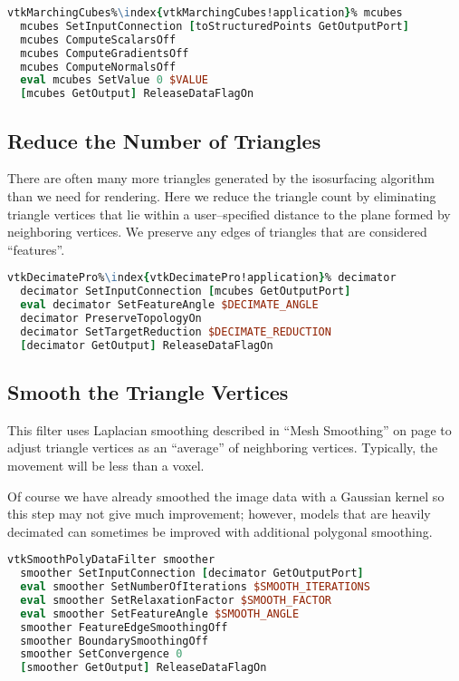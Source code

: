 \begin{lstlisting}[language=TCL, caption={Generate Triangles.}, escapechar=\%]
vtkMarchingCubes%\index{vtkMarchingCubes!application}% mcubes
  mcubes SetInputConnection [toStructuredPoints GetOutputPort]
  mcubes ComputeScalarsOff
  mcubes ComputeGradientsOff
  mcubes ComputeNormalsOff
  eval mcubes SetValue 0 $VALUE
  [mcubes GetOutput] ReleaseDataFlagOn
\end{lstlisting}

\subsection{Reduce the Number of Triangles}
There are often many more triangles generated by the isosurfacing algorithm than we need for rendering. Here we reduce the triangle count by eliminating triangle vertices that lie within a user--specified distance to the plane formed by neighboring vertices. We preserve any edges of triangles that are considered ``features''.

\begin{lstlisting}[language=TCL, caption={Reduce the Number of Triangles.}, escapechar=\%]
vtkDecimatePro%\index{vtkDecimatePro!application}% decimator
  decimator SetInputConnection [mcubes GetOutputPort]
  eval decimator SetFeatureAngle $DECIMATE_ANGLE
  decimator PreserveTopologyOn
  decimator SetTargetReduction $DECIMATE_REDUCTION
  [decimator GetOutput] ReleaseDataFlagOn
\end{lstlisting}

\subsection{Smooth the Triangle Vertices}

This filter uses Laplacian smoothing described in ``Mesh Smoothing'' on page \pageref{subsec:mesh_smoothing} to adjust triangle vertices as an ``average'' of neighboring vertices. Typically, the movement will be less than a voxel.

Of course we have already smoothed the image data with a Gaussian kernel so this step may not give much improvement; however, models that are heavily decimated can sometimes be improved with additional polygonal smoothing.

\begin{lstlisting}[language=TCL, caption={Smooth the Triangle Vertices.}]
vtkSmoothPolyDataFilter smoother
  smoother SetInputConnection [decimator GetOutputPort]
  eval smoother SetNumberOfIterations $SMOOTH_ITERATIONS
  eval smoother SetRelaxationFactor $SMOOTH_FACTOR
  eval smoother SetFeatureAngle $SMOOTH_ANGLE
  smoother FeatureEdgeSmoothingOff
  smoother BoundarySmoothingOff
  smoother SetConvergence 0
  [smoother GetOutput] ReleaseDataFlagOn
\end{lstlisting}


